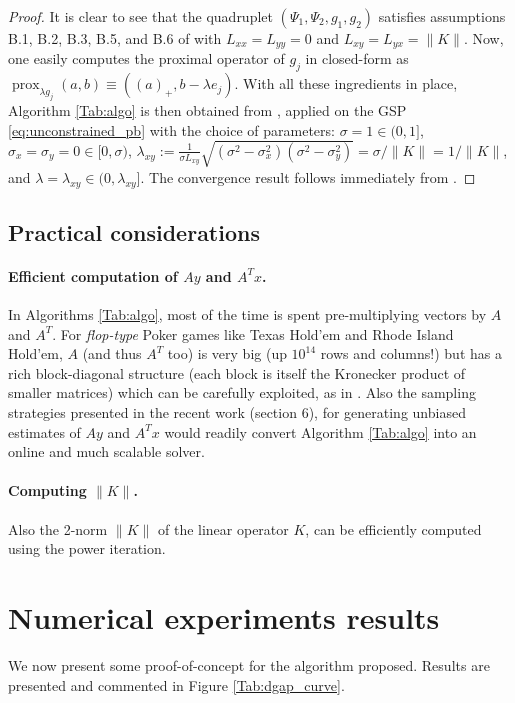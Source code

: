 \documentclass[a4paper,9pt]{extarticle}
\DeclareMathOperator{\prox}{prox}
\begin{document}
\begin{proof}
It is clear to see that the quadruplet $(\Psi_1, \Psi_2, g_1, g_2)$
satisfies assumptions B.1, B.2, B.3, B.5, and B.6 of
\cite{he2013accelerating} with $L_{xx} = L_{yy} = 0$ and $L_{xy} =
L_{yx} = \|K\|$. Now, one easily computes the proximal operator of
$g_j$ in closed-form as $\prox_{\lambda g_j}(a, b) \equiv ((a)_+,
b - \lambda e_j)$. With all these ingredients in place, Algorithm
\ref{Tab:algo} is then obtained from \cite[Algorithm
  T-BD]{he2013accelerating}, applied on the GSP
\eqref{eq:unconstrained_pb} with the choice of parameters: $\sigma = 1
\in (0, 1]$, $\sigma_x = \sigma_y = 0 \in [0, \sigma)$,
    $\lambda_{xy} := \frac{1}{\sigma L_{xy}}\sqrt{(\sigma^2 -
        \sigma_x^2)(\sigma^2 - \sigma_y^2)} = \sigma / \|K\| =
      1/\|K\|$, and $\lambda = \lambda_{xy} \in (0,
      \lambda_{xy}]$. The convergence result follows immediately from
  \cite[Theorem 4.2]{he2013accelerating}.
\end{proof}

\subsection{Practical considerations}
\paragraph*{Efficient computation of $Ay$ and $A^Tx$.}
In Algorithms \ref{Tab:algo}, most of the time is spent
pre-multiplying vectors by $A$ and $A^T$. For \textit{flop-type} Poker
games like Texas Hold'em and  Rhode Island Hold'em,
$A$ (and thus $A^T$ too)  is very big (up $10^{14}$ rows and columns!)
but has a rich block-diagonal structure (each block is itself the
Kronecker product of smaller matrices) which can be carefully
exploited, as in \cite{hoda2010smoothing}. Also the sampling
strategies presented in the recent work \cite{kroer2015} (section 6),
for generating unbiased estimates of $Ay$ and $A^Tx$ would readily
convert Algorithm \ref{Tab:algo} into an online and much scalable
solver.

\paragraph*{Computing $\|K\|$.}
Also the 2-norm $\|K\|$ of the linear operator $K$, can be efficiently
computed using the power iteration.

\section{Numerical experiments results}
\label{sec:results}
We now present some proof-of-concept for the algorithm proposed.
Results are presented and commented in Figure \ref{Tab:dgap_curve}.
\end{document}
